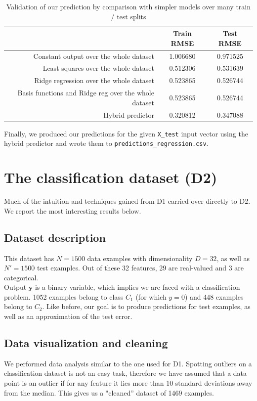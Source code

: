 \documentclass{article} %
\begin{document}
  \begin{table}[h]
    \center
    \begin{tabular}{|r|c|c|}
      \hline
                                              & Train RMSE & Test RMSE \\
      \hline
      Constant output over the whole dataset  & 1.006680   & 0.971525 \\
      \hline
      Least squares over the whole dataset    & 0.512306   & 0.531639 \\
      \hline
      Ridge regression over the whole dataset & 0.523865   & 0.526744 \\
      \hline
      Basis functions and Ridge reg over the whole dataset & 0.523865   & 0.526744 \\
      \hline
      Hybrid predictor                        & 0.320812   & 0.347088 \\
      \hline
    \end{tabular}
    \caption{Validation of our prediction by comparison with simpler models over many train / test splits}
    \label{predictorValidation}
  \end{table}

  Finally, we produced our predictions for the given \texttt{X\_test} input vector using the hybrid predictor and wrote them to \texttt{predictions\_regression.csv}.

\section{The classification dataset (D2)}
  Much of the intuition and techniques gained from D1 carried over directly to D2. We report the most interesting results below.

  \subsection{Dataset description}
  This dataset has $N = 1500$ data examples with dimensionality $D = 32$, as well as $N' = 1500$ test examples. Out of these 32 features, 29 are real-valued and 3 are categorical.\\
  Output $\mathbf{y}$ is a binary variable, which implies we are faced with a classification problem. 1052 examples belong to class $C_1$ (for which $y = 0$) and 448 examples belong to $C_2$. Like before, our goal is to produce predictions for test examples, as well as an approximation of the test error.

  \subsection{Data visualization and cleaning}
  We performed data analysis similar to the one used for D1. Spotting outliers on a classification dataset is not an easy task, therefore we have assumed that a data point is an outlier if for any feature it lies more than 10 standard deviations away from the median. This gives us a "cleaned'' dataset of 1469 examples.
\end{document}
